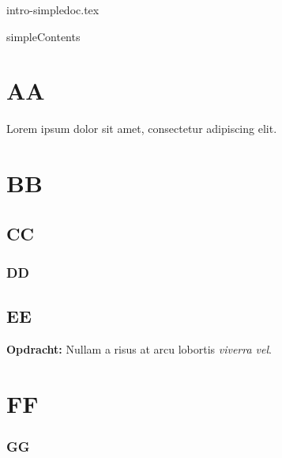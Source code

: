 \documentclass{cursuspresentatie}
\def\importslide#1#2{%
	{#2}
}
\begin{document}
    \importslide{intro}{intro-simpledoc.tex}


\begin{saveblock}{simpleContents}
    \begin{highlightblock}[linewidth=0.5\textwidth,gobble=8]
        \section{AA}
		Lorem ipsum dolor sit amet,
		consectetur adipiscing elit.
        
        \section{BB}
        \subsection{CC}
        \subsubsection{DD}
        \subsection{EE}
        \textbf{Opdracht:} Nullam
		a risus at arcu lobortis
		\textit{viverra vel}.
        
        \section{FF}
        \subsubsection{GG}
    \end{highlightblock}
\end{saveblock}
\end{document}
